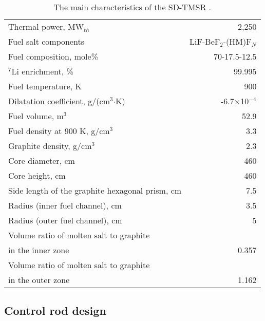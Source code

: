 \begin{table}  %
	\caption{The main characteristics of the SD-TMSR \cite{li_optimization_2018,ashraf2020whole}.}
	\vspace{0.1in}
	\begin{tabularx}{\textwidth}{l | r}
		\hline
		Thermal power, MW$_{th}$          				&  2,250  \\ 
		Fuel salt components                            & LiF-BeF$_2$-(\gls{HM})F$_N$ \\
		Fuel composition, mole\%                        & 70-17.5-12.5    \\
		$^7$Li enrichment, \%        				& 99.995   \\
		Fuel temperature, K 							& 900  \\
		Dilatation coefficient, g/(cm$^3$$\cdot{}$K)  &  -6.7$\times$10$^{-4}$ \\ 
		Fuel volume, m$^3$  &	52.9 \\
		Fuel density at 900 K, g/cm$^3$		  		& 3.3 \\
		Graphite density, g/cm$^3$             	    & 2.3	\\ 
		Core diameter, cm								& 460  \\
		Core height, cm									& 460  \\
		Side length of the graphite hexagonal prism, cm   & 7.5 \\
		Radius (inner fuel channel), cm							& 3.5  \\
		Radius (outer fuel channel), cm							& 5  \\
		Volume ratio of molten salt to graphite \\in the inner zone	&  0.357  \\
		Volume ratio of molten salt to graphite \\in the outer zone &  1.162  \\
		
		\hline
	\end{tabularx}
	\label{tab:table1}
\end{table}

\subsection{Control rod design} \label{CRD}

